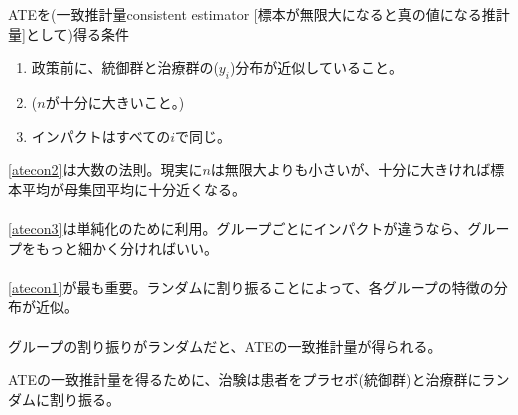 \begin{frame}[label=ATEConsistencyCondition, t]{}
ATEを(一致推計量consistent estimator [標本が無限大になると真の値になる推計量]として)得る条件
\begin{enumerate}
\vspace{1.0ex}\setlength{\itemsep}{1.0ex}\setlength{\baselineskip}{12pt}
\item	政策前に、統御群と治療群の($y_{i}$)分布が近似していること。\label{atecon1}
\item	($n$が十分に大きいこと。)\label{atecon2}
\item	インパクトはすべての$i$で同じ。\label{atecon3}
\end{enumerate}

\pause
\vspace{1.0ex}
\ref{atecon2}は大数の法則。現実に$n$は無限大よりも小さいが、十分に大きければ標本平均が母集団平均に十分近くなる。\\~\\

\pause
\ref{atecon3}は単純化のために利用。グループごとにインパクトが違うなら、グループをもっと細かく分ければいい。\\~\\

\pause
\ref{atecon1}が最も重要。ランダムに割り振ることによって、各グループの特徴の分布が近似。\\~\\

\pause
グループの割り振りがランダムだと、ATEの一致推計量が得られる。
\begin{dinglist}{43}
\vspace{1.0ex}\setlength{\itemsep}{1.0ex}\setlength{\baselineskip}{12pt}
\item	ATEの一致推計量を得るために、治験は患者をプラセボ(統御群)と治療群にランダムに割り振る。
\end{dinglist}
\end{frame}

